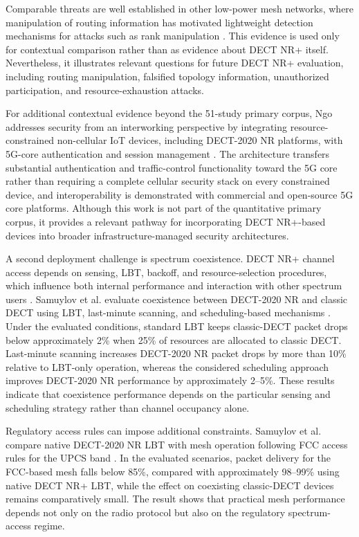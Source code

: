 Comparable threats are well established in other low-power mesh networks,
where manipulation of routing information has motivated lightweight detection
mechanisms for attacks such as rank manipulation
\cite{kalyaniResourceefficientEnsembleMachine2026}. This evidence is used
only for contextual comparison rather than as evidence about DECT NR+
itself. Nevertheless, it illustrates relevant questions for future DECT NR+
evaluation, including routing manipulation, falsified topology information,
unauthorized participation, and resource-exhaustion attacks.

For additional contextual evidence beyond the 51-study primary corpus, Ngo
addresses security from an interworking perspective by integrating
resource-constrained non-cellular IoT devices, including DECT-2020 NR
platforms, with 5G-core authentication and session management
\cite{ngoIoTDeviceAuthentication2025}. The architecture transfers substantial
authentication and traffic-control functionality toward the 5G core rather
than requiring a complete cellular security stack on every constrained device,
and interoperability is demonstrated with commercial and open-source 5G core
platforms. Although this work is not part of the quantitative primary corpus,
it provides a relevant pathway for incorporating DECT NR+-based devices into
broader infrastructure-managed security architectures.

A second deployment challenge is spectrum coexistence. DECT NR+ channel
access depends on sensing, LBT, backoff, and resource-selection procedures,
which influence both internal performance and interaction with other spectrum
users
\cite{etsi_ts103636_2,etsi_ts103636_4}. Samuylov et al. evaluate coexistence
between DECT-2020 NR and classic DECT using LBT, last-minute scanning, and
scheduling-based mechanisms
\cite{samuylovPerformanceAssessmentDECT20202023}. Under the evaluated
conditions, standard LBT keeps classic-DECT packet drops below approximately
2\% when 25\% of resources are allocated to classic DECT. Last-minute
scanning increases DECT-2020 NR packet drops by more than 10\% relative to
LBT-only operation, whereas the considered scheduling approach improves
DECT-2020 NR performance by approximately 2--5\%. These results indicate that
coexistence performance depends on the particular sensing and scheduling
strategy rather than channel occupancy alone.

Regulatory access rules can impose additional constraints. Samuylov et al.
compare native DECT-2020 NR LBT with mesh operation following FCC access rules
for the UPCS band
\cite{samuylovPerformanceDECT2020NR2025}. In the evaluated scenarios, packet
delivery for the FCC-based mesh falls below 85\%, compared with approximately
98--99\% using native DECT NR+ LBT, while the effect on coexisting
classic-DECT devices remains comparatively small. The result shows that
practical mesh performance depends not only on the radio protocol but also on
the regulatory spectrum-access regime.

